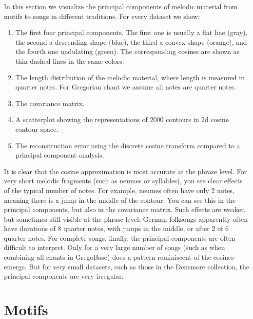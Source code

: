 \documentclass[a4paper, fontsize=9pt, twocolumn]{scrreprt}
\begin{document}
In this section we visualize the principal components of melodic material from motifs to songs in different traditions.
For every dataset we show:
\begin{enumerate}[label={\textbf{\textsc{\alph*.}}}]
    \item The first four principal components. The first one is usually a flat line (gray), the second a descending shape (blue), the third a convex shape (orange), and the fourth one undulating (green).
    The corresponding cosines are shown as thin dashed lines in the same colors.
    \item The length distribution of the melodic material, where length is measured in quarter notes. For Gregorian chant we assume all notes are quarter notes.
    \item The covariance matrix.
    \item A scatterplot showing the representations of 2000 contours in 2d cosine contour space.
    \item The reconstruction error using the discrete cosine transform compared to a principal component analysis.
\end{enumerate}
It is clear that the cosine approximation is most accurate at the phrase level. 
For very short melodic fragments (such as neumes or syllables), you see clear effects of the typical number of notes.
For example, neumes often have only 2 notes, meaning there is a jump in the middle of the contour. You can see this in the principal components, but also in the covariance matrix.
Such effects are weaker, but sometimes still visible at the phrase level: German folksongs apparently often have durations of 8 quarter notes, with jumps in the middle, or after 2 of 6 quarter notes.
For complete songs, finally, the principal components are often difficult to interpret.
Only for a very large number of songs (such as when combining all chants in GregoBase) does a pattern reminiscent of the cosines emerge.
But for very small datasets, such as those in the Densmore collection, the principal components are very irregular. 


\vfill
\pagebreak

\newcommand{\showdataset}[2]{%
    \subsubsection*{#2}
    \texttt{[image: \#1]}
    \par
}


\section{Motifs}
\end{document}
